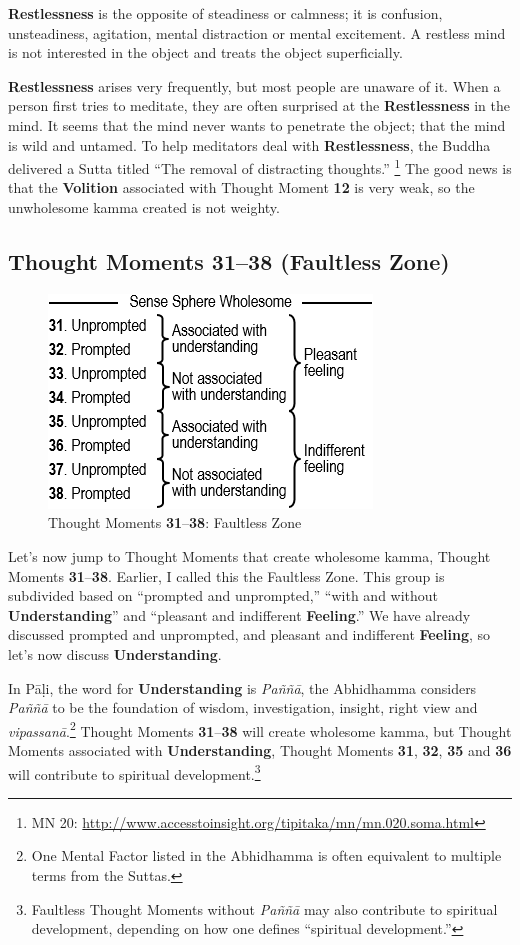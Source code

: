 \textbf{Restlessness} is the opposite of steadiness or calmness; it is confusion, unsteadiness, agitation, mental distraction or mental excitement. A restless mind is not interested in the object and treats the object superficially.

\textbf{Restlessness} arises very frequently, but most people are unaware of it. When a person first tries to meditate, they are often surprised at the \textbf{Restlessness} in the mind. It seems that the mind never wants to penetrate the object; that the mind is wild and untamed. To help meditators deal with \textbf{Restlessness}, the Buddha delivered a Sutta titled “The removal of distracting thoughts.” \footnote{MN 20: \url{http://www.accesstoinsight.org/tipitaka/mn/mn.020.soma.html}} The good news is that the \textbf{Volition} associated with Thought Moment \textbf{12} is very weak, so the unwholesome kamma created is not weighty.

\subsection*{Thought Moments 31--38 (Faultless Zone)}

\begin{figure}[h]
\centering
\includegraphics[width=0.46\linewidth]{./Diagrams/Faultless}
\caption{Thought Moments \textbf{31}--\textbf{38}: Faultless Zone}
\label{fig:Faultless}
\end{figure}

Let’s now jump to Thought Moments that create wholesome kamma, Thought Moments \textbf{31}--\textbf{38}. Earlier, I called this the Faultless Zone. This group is subdivided based on “prompted and unprompted,” “with and without \textbf{Understanding}” and “pleasant and indifferent \textbf{Feeling}.” We have already discussed prompted and unprompted, and pleasant and indifferent \textbf{Feeling}, so let’s now discuss \textbf{Understanding}.

In Pāḷi, the word for \textbf{Understanding} is \textit{Paññā}, the Abhidhamma considers \textit{Paññā} to be the foundation of wisdom, investigation, insight, right view and \textit{vipassanā}.\footnote{One Mental Factor listed in the Abhidhamma is often equivalent to multiple terms from the Suttas.} Thought Moments \textbf{31}--\textbf{38} will create wholesome kamma, but Thought Moments associated with \textbf{Understanding}, Thought Moments \textbf{31}, \textbf{32}, \textbf{35} and \textbf{36} will contribute to spiritual development.\footnote{Faultless Thought Moments without \textit{Paññā} may also contribute to spiritual development, depending on how one defines “spiritual development.”}

